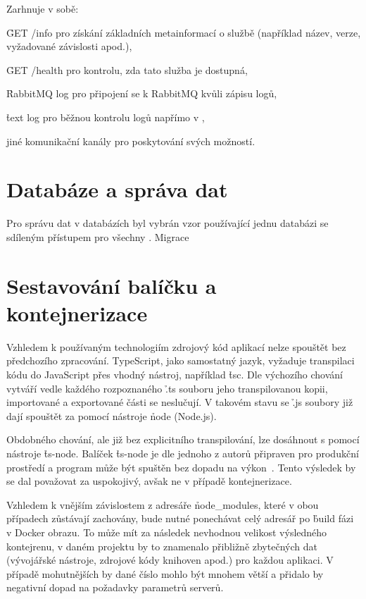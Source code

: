 Zarhnuje v sobě:

\begin{ul}
   \item \h{GET  /info} pro získání základních metainformací o službě (například název, verze, vyžadované závislosti apod.),
   \item \h{GET  /health} pro kontrolu, zda tato služba je dostupná,
   \item \h{RabbitMQ log} pro připojení se k RabbitMQ kvůli zápisu logů,
   \item \h{text log} pro běžnou kontrolu logů napřímo v ,
   \item jiné komunikační kanály pro poskytování svých možností.
\end{ul}



\section{Databáze a správa dat}\label{sec:server-db}

Pro správu dat v databázích byl vybrán vzor používající jednu databázi se sdíleným přístupem pro všechny .
Migrace



\section{Sestavování balíčku a kontejnerizace}\label{sec:server-compile}

Vzhledem k používaným technologiím zdrojový kód aplikací nelze spouštět bez předchozího zpracování.
TypeScript, jako samostatný jazyk, vyžaduje transpilaci kódu do JavaScript přes vhodný nástroj, například \h{tsc}.
Dle výchozího chování vytváří vedle každého rozpoznaného \h{.ts} souboru jeho transpilovanou kopii, importované a exportované části se neslučují.
V takovém stavu se \h{.js} soubory již dají spouštět za pomocí nástroje \h{node} (Node.js).

Obdobného chování, ale již bez explicitního transpilování, lze dosáhnout s pomocí nástroje \h{ts-node}.
Balíček \h{ts-node} je dle jednoho z autorů připraven pro produkční prostředí a program může být spuštěn bez dopadu na výkon~\cite{tsnodeprod}.
Tento výsledek by se dal považovat za uspokojivý, avšak ne v případě kontejnerizace.

Vzhledem k vnějším závislostem z adresáře \h{node\_modules}, které v obou případech zůstávají zachovány, bude nutné ponechávat celý adresář po \h{build} fázi v Docker obrazu.
To může mít za následek nevhodnou velikost výsledného kontejrenu, v daném projektu by to znamenalo přibližně  zbytečných dat (vývojářské nástroje, zdrojové kódy knihoven apod.) pro každou aplikaci.
V případě mohutnějších  by dané číslo mohlo být mnohem větší a přidalo by negativní dopad na požadavky parametrů serverů.

